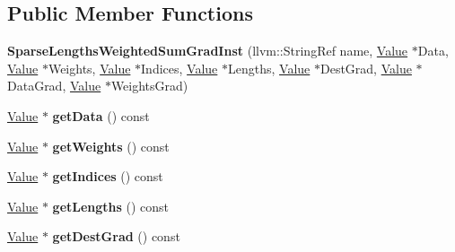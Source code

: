 \subsection*{Public Member Functions}
\begin{DoxyCompactItemize}
\item 
\mbox{\label{classglow_1_1_sparse_lengths_weighted_sum_grad_inst_afef656dcbe10b6fddd9556a9822d7ab2}} 
{\bfseries Sparse\+Lengths\+Weighted\+Sum\+Grad\+Inst} (llvm\+::\+String\+Ref name, \hyperlink{classglow_1_1_value}{Value} $\ast$Data, \hyperlink{classglow_1_1_value}{Value} $\ast$Weights, \hyperlink{classglow_1_1_value}{Value} $\ast$Indices, \hyperlink{classglow_1_1_value}{Value} $\ast$Lengths, \hyperlink{classglow_1_1_value}{Value} $\ast$Dest\+Grad, \hyperlink{classglow_1_1_value}{Value} $\ast$Data\+Grad, \hyperlink{classglow_1_1_value}{Value} $\ast$Weights\+Grad)
\item 
\mbox{\label{classglow_1_1_sparse_lengths_weighted_sum_grad_inst_a0f1084c8226690298e5324a316ca3c2d}} 
\hyperlink{classglow_1_1_value}{Value} $\ast$ {\bfseries get\+Data} () const
\item 
\mbox{\label{classglow_1_1_sparse_lengths_weighted_sum_grad_inst_a01bdde39b651a39f3d455e87dddab1d7}} 
\hyperlink{classglow_1_1_value}{Value} $\ast$ {\bfseries get\+Weights} () const
\item 
\mbox{\label{classglow_1_1_sparse_lengths_weighted_sum_grad_inst_ada78b56375a39c9b1ea16405d3da1f83}} 
\hyperlink{classglow_1_1_value}{Value} $\ast$ {\bfseries get\+Indices} () const
\item 
\mbox{\label{classglow_1_1_sparse_lengths_weighted_sum_grad_inst_acf91f01c2129088248c5040eb1837425}} 
\hyperlink{classglow_1_1_value}{Value} $\ast$ {\bfseries get\+Lengths} () const
\item 
\mbox{\label{classglow_1_1_sparse_lengths_weighted_sum_grad_inst_a3b61cbfda2751ac5f91cfc530e786e3a}} 
\hyperlink{classglow_1_1_value}{Value} $\ast$ {\bfseries get\+Dest\+Grad} () const

\end{DoxyCompactItemize}
